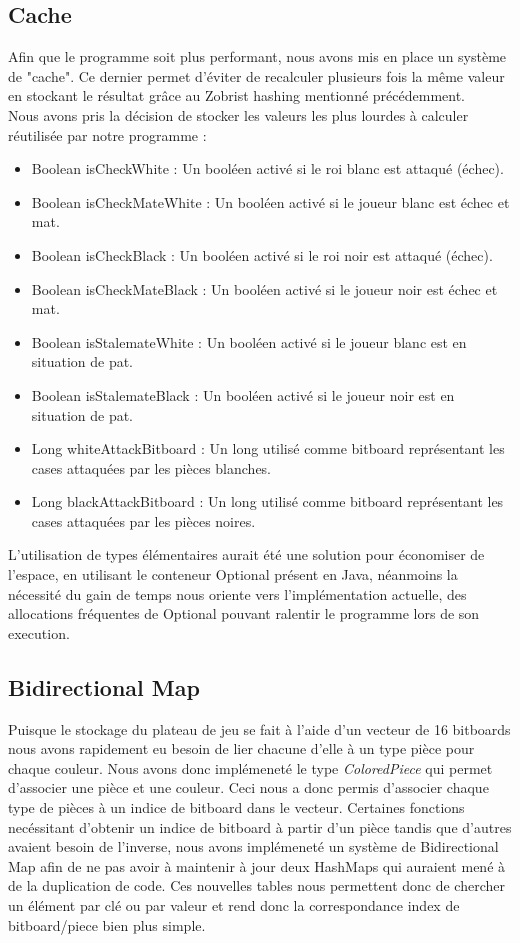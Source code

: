 \documentclass{article}
\begin{document}
\subsection{Cache}
Afin que le programme soit plus performant, nous avons mis en place un système de "cache". Ce dernier permet d'éviter de recalculer plusieurs fois la même valeur en stockant le résultat grâce au Zobrist hashing mentionné précédemment.\\


Nous avons pris la décision de stocker les valeurs les plus lourdes à calculer réutilisée par notre programme :
\begin{itemize}
    \item Boolean isCheckWhite : Un booléen activé si le roi blanc est attaqué (échec).
    \item Boolean isCheckMateWhite : Un booléen activé si le joueur blanc est échec et mat.
    \item Boolean isCheckBlack : Un booléen activé si le roi noir est attaqué (échec).
    \item Boolean isCheckMateBlack : Un booléen activé si le joueur noir est échec et mat.
    \item Boolean isStalemateWhite : Un booléen activé si le joueur blanc est en situation de pat.
    \item Boolean isStalemateBlack : Un booléen activé si le joueur noir est en situation de pat.
    \item Long whiteAttackBitboard : Un long utilisé comme bitboard représentant les cases attaquées par les pièces blanches.
    \item Long blackAttackBitboard : Un long utilisé comme bitboard représentant les cases attaquées par les pièces noires.\\
\end{itemize}

L'utilisation de types élémentaires aurait été une solution pour économiser de l'espace, en utilisant le conteneur Optional présent en Java, néanmoins la nécessité du gain de temps nous oriente vers l'implémentation actuelle, des allocations fréquentes de Optional pouvant ralentir le programme lors de son execution.

\subsection{Bidirectional Map}
Puisque le stockage du plateau de jeu se fait à l'aide d'un vecteur de 16 bitboards nous avons rapidement eu besoin de lier chacune d'elle à un type pièce pour chaque couleur.
Nous avons donc implémeneté le type \textit{ColoredPiece} qui permet d'associer une pièce et une couleur. Ceci nous a donc permis d'associer chaque type de pièces à un indice
de bitboard dans le vecteur. Certaines fonctions necéssitant d'obtenir un indice de bitboard à partir d'un pièce tandis que d'autres avaient besoin de l'inverse, nous avons implémeneté un système
de Bidirectional Map afin de ne pas avoir à maintenir à jour deux HashMaps qui auraient mené à de la duplication de code. Ces nouvelles tables nous permettent donc de chercher un élément par clé ou par valeur et rend donc la
correspondance index de bitboard/piece bien plus simple. 
\end{document}
